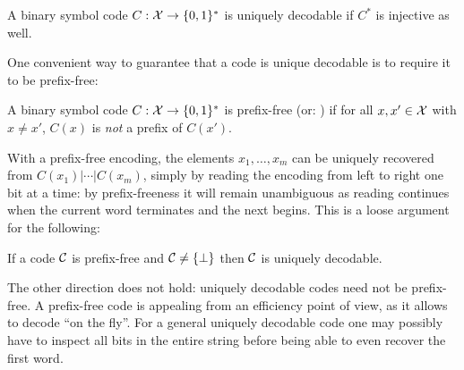 \begin{definition}
A binary symbol code $C : {\cal X} \to \{0,1\}^*$ is uniquely decodable if $C^*$ is injective as well.
\end{definition}

One convenient way to guarantee that a code is unique decodable is to require it to be prefix-free:
\begin{definition}
A binary symbol code $C : {\cal X} \to \{0,1\}^*$ is prefix-free (or: ) if for all $x, x' \in \cal X$ with $x \neq x'$, $C(x)$ is {\em not} a prefix of $C(x')$.
\end{definition}

With a prefix-free encoding, the elements
$x_1, \ldots, x_m$ can be uniquely recovered from $C(x_1)|\cdots
|C(x_m)$, simply by reading the encoding from left to right one bit
at a time: by prefix-freeness it will remain unambiguous as reading
continues when the current word terminates and the next begins. This is a loose argument for the following:
\begin{proposition}\label{lemma:PF->UD}
If a code $\cal C$ is prefix-free and ${\cal C} \neq \{\bot\}$ then $\cal C$ is uniquely decodable. 
\end{proposition}
The other direction does not hold: uniquely decodable codes need not be prefix-free. A prefix-free code is appealing from an efficiency point of view, as it allows to decode ``on the fly''. For a general uniquely decodable code one may possibly have to inspect all bits
in the entire string before being able to even recover the first word. 

